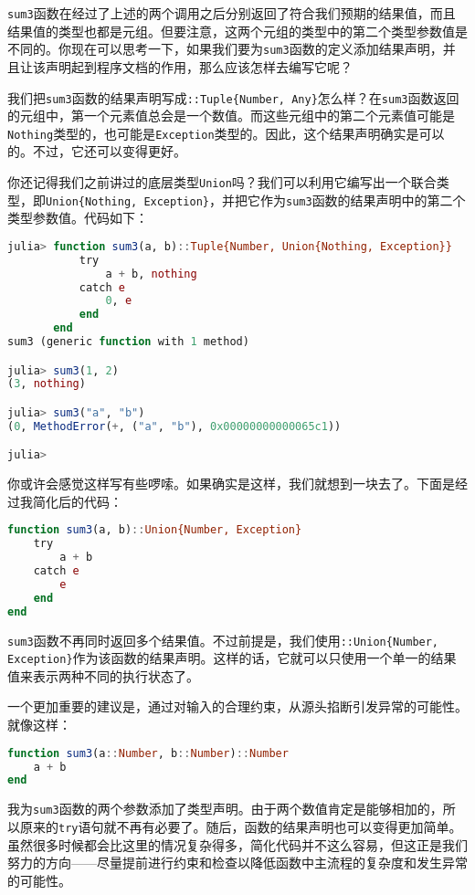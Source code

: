 \verb`sum3`函数在经过了上述的两个调用之后分别返回了符合我们预期的结果值，而且结果值的类型也都是元组。但要注意，这两个元组的类型中的第二个类型参数值是不同的。你现在可以思考一下，如果我们要为\verb`sum3`函数的定义添加结果声明，并且让该声明起到程序文档的作用，那么应该怎样去编写它呢？

我们把\verb`sum3`函数的结果声明写成\verb`::Tuple{Number, Any}`怎么样？在\verb`sum3`函数返回的元组中，第一个元素值总会是一个数值。而这些元组中的第二个元素值可能是\verb`Nothing`类型的，也可能是\verb`Exception`类型的。因此，这个结果声明确实是可以的。不过，它还可以变得更好。

你还记得我们之前讲过的底层类型\verb`Union`吗？我们可以利用它编写出一个联合类型，即\verb`Union{Nothing, Exception}`，并把它作为\verb`sum3`函数的结果声明中的第二个类型参数值。代码如下：

\begin{lstlisting}[language=julia]
julia> function sum3(a, b)::Tuple{Number, Union{Nothing, Exception}}
           try
               a + b, nothing
           catch e
               0, e
           end
       end
sum3 (generic function with 1 method)

julia> sum3(1, 2)
(3, nothing)

julia> sum3("a", "b")
(0, MethodError(+, ("a", "b"), 0x00000000000065c1))

julia> 
\end{lstlisting}

你或许会感觉这样写有些啰嗦。如果确实是这样，我们就想到一块去了。下面是经过我简化后的代码：

\begin{lstlisting}[language=julia]
function sum3(a, b)::Union{Number, Exception}
    try
        a + b
    catch e
        e
    end
end
\end{lstlisting}

\verb`sum3`函数不再同时返回多个结果值。不过前提是，我们使用\verb`::Union{Number, Exception}`作为该函数的结果声明。这样的话，它就可以只使用一个单一的结果值来表示两种不同的执行状态了。

一个更加重要的建议是，通过对输入的合理约束，从源头掐断引发异常的可能性。就像这样：

\begin{lstlisting}[language=julia]
function sum3(a::Number, b::Number)::Number
    a + b
end
\end{lstlisting}

我为\verb`sum3`函数的两个参数添加了类型声明。由于两个数值肯定是能够相加的，所以原来的\verb`try`语句就不再有必要了。随后，函数的结果声明也可以变得更加简单。虽然很多时候都会比这里的情况复杂得多，简化代码并不这么容易，但这正是我们努力的方向——尽量提前进行约束和检查以降低函数中主流程的复杂度和发生异常的可能性。

